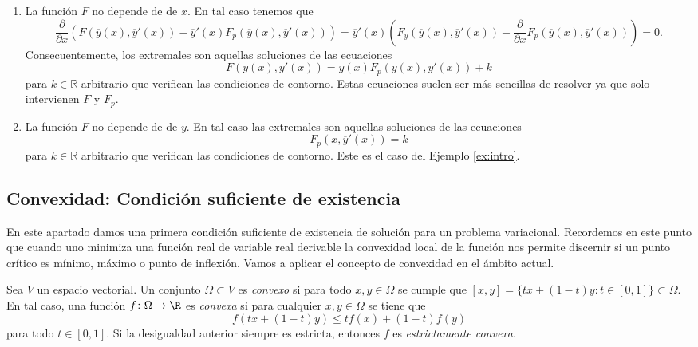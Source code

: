 \documentclass{article}
\begin{document}
\begin{enumerate}
\item La función $F$ no depende de de $x$. En tal caso tenemos que
  \[\frac{\partial}{\partial x} \left(F(\overline{y}(x), \overline{y}'(x)) - \overline{y}'(x)
      F_p(\overline{y}(x), \overline{y}'(x))\right) = \overline{y}'(x) \left(F_y(\overline{y}(x),
      \overline{y}'(x)) - \frac{\partial}{\partial x} F_p(\overline{y}(x), \overline{y}'(x))\right)
    = 0.\] Consecuentemente, los extremales son aquellas soluciones de las ecuaciones
  \begin{equation}
    \label{eq:el:x}
    F(\overline{y}(x), \overline{y}'(x)) = \overline{y}(x) F_p(\overline{y}(x), \overline{y}'(x)) + k
  \end{equation}
  para $k \in \mathbb{R}$ arbitrario que verifican las condiciones de contorno. Estas ecuaciones
  suelen ser más sencillas de resolver ya que solo intervienen $F$ y $F_p$.
\item La función $F$ no depende de de $y$. En tal caso las extremales son aquellas soluciones de las
  ecuaciones
  \begin{equation}
    \label{eq:el:y}
    F_p(x, \overline{y}'(x)) = k
  \end{equation}
  para $k \in \mathbb{R}$ arbitrario que verifican las condiciones de contorno. Este es el caso del
  Ejemplo \ref{ex:intro}.
\end{enumerate}

\subsection{Convexidad: Condición suficiente de existencia}

En este apartado damos una primera condición suficiente de existencia de solución para un problema
variacional. Recordemos en este punto que cuando uno minimiza una función real de variable real
derivable la convexidad local de la función nos permite discernir si un punto crítico es mínimo,
máximo o punto de inflexión. Vamos a aplicar el concepto de convexidad en el ámbito actual.

\begin{definition}
  Sea $V$ un espacio vectorial. Un conjunto $\Omega \subset V$ es \emph{convexo} si para todo
  $x,y \in \Omega$ se cumple que $[x,y] = \{tx+(1-t)y \colon t \in [0,1]\} \subset \Omega$. En tal
  caso, una función $f \colon \Omega \to \R$ es \emph{convexa} si para cualquier $x,y \in \Omega$ se
  tiene que
  \[ f(tx + (1-t)y) \le tf(x) + (1-t)f(y) \] para todo $t \in [0,1]$. Si la desigualdad anterior
  siempre es estricta, entonces $f$ es \emph{estrictamente convexa}.
\end{definition}
\end{document}
